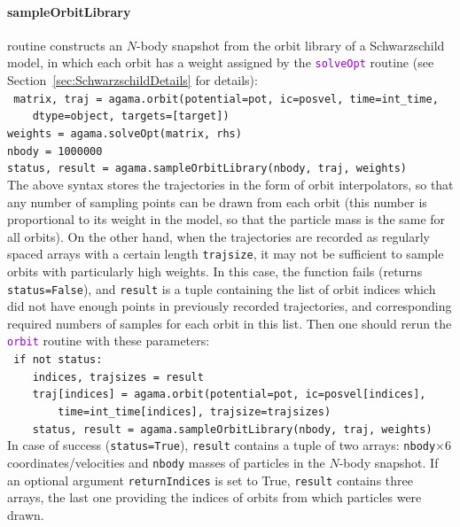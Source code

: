 \documentclass[12pt]{article}
\newcommand{\ttt}[1]{\textcolor{darkviolet}{\texttt{#1}}}
\let\oldparagraph\paragraph
\renewcommand{\paragraph}[1]{\vspace{-2mm}\oldparagraph{#1}}
\begin{document}
\paragraph{sampleOrbitLibrary} routine constructs an $N$-body snapshot from the orbit library of a Schwarzschild model, in which each orbit has a weight assigned by the \ttt{solveOpt} routine (see Section~\ref{sec:SchwarzschildDetails} for details):\\[1mm]
\texttt{
matrix, traj = agama.orbit(potential=pot, ic=posvel, time=int_time, \\
\mbox{}~~~~dtype=object, targets=[target])\\
weights = agama.solveOpt(matrix, rhs)\\
nbody = 1000000\\
status, result = agama.sampleOrbitLibrary(nbody, traj, weights)}\\[2mm]
The above syntax stores the trajectories in the form of orbit interpolators, so that any number of sampling points can be drawn from each orbit (this number is proportional to its weight in the model, so that the particle mass is the same for all orbits). On the other hand, when the trajectories are recorded as regularly spaced arrays with a certain length \texttt{trajsize}, it may not be sufficient to sample orbits with particularly high weights. In this case, the function fails (returns \texttt{status=False}), and \texttt{result} is a tuple containing the list of orbit indices which did not have enough points in previously recorded trajectories, and corresponding required numbers of samples for each orbit in this list. Then one should rerun the \ttt{orbit} routine with these parameters:\\[1mm]
\texttt{
if not status:\\
\mbox{}~~~~indices, trajsizes = result\\
\mbox{}~~~~traj[indices] = agama.orbit(potential=pot, ic=posvel[indices], \\
\mbox{}~~~~~~~~time=int_time[indices], trajsize=trajsizes)\\
\mbox{}~~~~status, result = agama.sampleOrbitLibrary(nbody, traj, weights)}\\[2mm]
In case of success (\texttt{status=True}), \texttt{result} contains a tuple of two arrays: \texttt{nbody}$\times6$ coordinates/velocities and \texttt{nbody} masses of particles in the $N$-body snapshot. If an optional argument \texttt{returnIndices} is set to True, \texttt{result} contains three arrays, the last one providing the indices of orbits from which particles were drawn.
\end{document}
